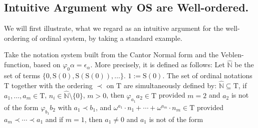 \documentclass[10pt]{article}
\def\nathat{\widehat{\mathbb{N}}}
\def\T{\mathrm{T}}
\def\S{\mathrm{S}}
\begin{document}
\subsection{\bf Intuitive Argument why OS are Well-ordered.}
We will first illustrate, what we regard as an intuitive argument for the
well-ordering of ordinal system, by taking a standard example.\par 
Take the notation system built from the
Cantor Normal form and the Veblen-function, based on $\varphi_0 \alpha = 
\epsilon_\alpha$. More precisely, it is  defined as follows:
Let $\nathat$ be the set of terms $\{ 0,\S(0),\S(\S(0)) ,\ldots \}$.
$1:= \S(0)$.
The set of ordinal notations $\T$ together with the ordering
$\prec$ on $\T$ are simultaneously defined by:
$\nathat \subseteq \T$, if
$a_1 ,\ldots, a_m \in \T $, $n_i \in \nathat \setminus \{ 0 \} $, 
$m>0$, 
then 
$\varphi_{a_1}a_2 \in \T $
provided $m=2$ and $a_2$ is not of the form
$\varphi_{b_1}b_2$ with $a_1 \prec b_1$, 
and 
$\omega^{a_1} \cdot n_1 +\cdots+ \omega^{a_m} \cdot n_m \in \T$
provided $a_m \prec \cdots \prec a_1$
and if $m=1$, then $a_1 \not = 0$ and $a_1$ is not of the form
\end{document}
